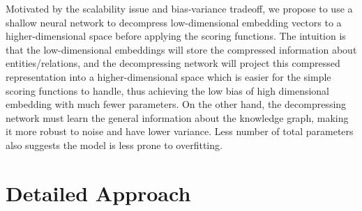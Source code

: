 \documentclass[letterpaper]{article} \usepackage{aaai20}  \usepackage{times}  \usepackage{helvet} \usepackage{courier}  \usepackage{booktabs}
\begin{document}
Motivated by the scalability issue and bias-variance tradeoff, we propose to use a shallow neural network to decompress low-dimensional embedding vectors to a higher-dimensional space before applying the scoring functions. The intuition is that the low-dimensional embeddings will store the compressed information about entities/relations, and the decompressing network will project this compressed representation into a higher-dimensional space which is easier for the simple scoring functions to handle, thus achieving the low bias of high dimensional embedding with much fewer parameters. On the other hand, the decompressing network must learn the general information about the knowledge graph, making it more robust to noise and have lower variance. Less number of total parameters also suggests the model is less prone to overfitting. 



\section{Detailed Approach}
\end{document}
